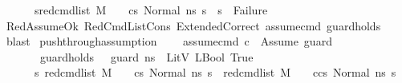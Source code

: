 \begin{isabellebody}
\ \ \ \ \ {\isachardoublequoteopen}{\isacharparenleft}{\kern0pt}{\isasymAnd}\ s{}{\isacharprime}{\kern0pt}{\isachardot}{\kern0pt}{\isacharparenleft}{\kern0pt}red{\isacharunderscore}{\kern0pt}cmd{\isacharunderscore}{\kern0pt}list\ M\ {\isasymLambda}\ {\isasymGamma}\ {\isasymOmega}\ cs{}\ {\isacharparenleft}{\kern0pt}Normal\ ns{}{\isacharparenright}{\kern0pt}\ s{}{\isacharprime}{\kern0pt}{\isacharparenright}{\kern0pt}\ {\isasymLongrightarrow}\ s{}{\isacharprime}{\kern0pt}\ {\isasymnoteq}\ Failure{\isacharparenright}{\kern0pt}{\isachardoublequoteclose}\ \ \isanewline
%
\isadelimproof
\ \ %
\endisadelimproof
%
\isatagproof
{}\isamarkupfalse%
\ RedAssumeOk\ RedCmdListCons\ ExtendedCorrect\ assume{\isacharunderscore}{\kern0pt}cmd\ guard{\isacharunderscore}{\kern0pt}holds\ \isanewline
\ \ \isamarkupfalse%
\ blast%
\endisatagproof
{\isafoldproof}%
%
\isadelimproof
\isanewline
%
\endisadelimproof
\isanewline
{}\isamarkupfalse%
\ push{\isacharunderscore}{\kern0pt}through{\isacharunderscore}{\kern0pt}assumption{}{\isacharcolon}{\kern0pt}\ \isanewline
\ \ \ assume{\isacharunderscore}{\kern0pt}cmd{\isacharcolon}{\kern0pt}\ {\isachardoublequoteopen}c\ {\isacharequal}{\kern0pt}\ Assume\ guard{\isachardoublequoteclose}\isanewline
\ \ \ \ \ \ \ guard{\isacharunderscore}{\kern0pt}holds{\isacharcolon}{\kern0pt}\ {\isachardoublequoteopen}{\isasymLambda}{\isacharcomma}{\kern0pt}{\isasymGamma}{\isacharcomma}{\kern0pt}{\isasymOmega}\ {\isasymturnstile}\ {\isasymlangle}guard{\isacharcomma}{\kern0pt}\ ns{}{\isasymrangle}\ {\isasymDown}\ LitV\ {\isacharparenleft}{\kern0pt}LBool\ True{\isacharparenright}{\kern0pt}{\isachardoublequoteclose}\isanewline
\ \ \ \ \ {\isachardoublequoteopen}{\isasymAnd}\ s{\isachardot}{\kern0pt}\ {\isacharparenleft}{\kern0pt}red{\isacharunderscore}{\kern0pt}cmd{\isacharunderscore}{\kern0pt}list\ M\ {\isasymLambda}\ {\isasymGamma}\ {\isasymOmega}\ {\isacharparenleft}{\kern0pt}cs{}{\isacharparenright}{\kern0pt}\ {\isacharparenleft}{\kern0pt}Normal\ ns{}{\isacharparenright}{\kern0pt}\ s{\isacharparenright}{\kern0pt}\ {\isasymLongrightarrow}\ {\isacharparenleft}{\kern0pt}red{\isacharunderscore}{\kern0pt}cmd{\isacharunderscore}{\kern0pt}list\ M\ {\isasymLambda}\ {\isasymGamma}\ {\isasymOmega}\ {\isacharparenleft}{\kern0pt}c{\isacharhash}{\kern0pt}cs{}{\isacharparenright}{\kern0pt}\ {\isacharparenleft}{\kern0pt}Normal\ ns{}{\isacharparenright}{\kern0pt}\ s{\isacharparenright}{\kern0pt}{\isachardoublequoteclose}\ \isanewline

\end{isabellebody}

